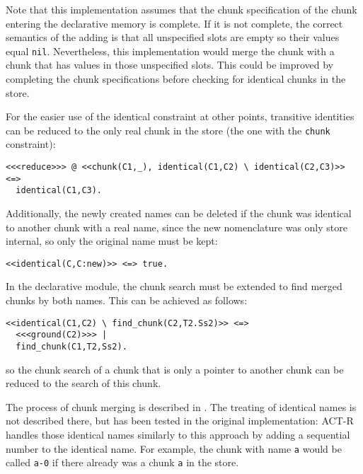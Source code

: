 Note that this implementation assumes that the chunk specification of the chunk entering the declarative memory is complete. If it is not complete, the correct semantics of the adding is that all unspecified slots are empty so their values equal \verb|nil|. Nevertheless, this implementation would merge the chunk with a chunk that has values in those unspecified slots. This could be improved by completing the chunk specifications before checking for identical chunks in the store.

For the easier use of the identical constraint at other points, transitive identities can be reduced to the only real chunk in the store (the one with the \verb|chunk| constraint):

\begin{lstlisting}
<<<reduce>>> @ <<chunk(C1,_), identical(C1,C2) \ identical(C2,C3)>> <=> 
  identical(C1,C3).
\end{lstlisting}

Additionally, the newly created names can be deleted if the chunk was identical to another chunk with a real name, since the new nomenclature was only store internal, so only the original name must be kept:

\begin{lstlisting}
<<identical(C,C:new)>> <=> true.
\end{lstlisting}

In the declarative module, the chunk search must be extended to find merged chunks by both names. This can be achieved as follows:

\begin{lstlisting}
<<identical(C1,C2) \ find_chunk(C2,T2.Ss2)>> <=> 
  <<<ground(C2)>>> | 
  find_chunk(C1,T2,Ss2).
\end{lstlisting}

so the chunk search of a chunk that is only a pointer to another chunk can be reduced to the search of this chunk. 

The process of chunk merging is described in \cite[??]{actr_reference}. The treating of identical names is not described there, but has been tested in the original implementation: ACT-R handles those identical names similarly to this approach by adding a sequential number to the identical name. For example, the chunk with name \verb|a| would be called \verb|a-0| if there already was a chunk \verb|a| in the store.

